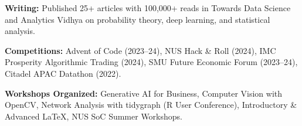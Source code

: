 \documentclass[10pt,a4paper]{article}
\begin{document}
\textbf{Writing:} Published 25+ articles with 100,000+ reads in Towards Data Science and Analytics Vidhya on probability theory, deep learning, and statistical analysis.

\vspace{3pt}

\textbf{Competitions:} Advent of Code (2023--24), NUS Hack \& Roll (2024), IMC Prosperity Algorithmic Trading (2024), SMU Future Economic Forum (2023--24), Citadel APAC Datathon (2022).

\vspace{3pt}

\textbf{Workshops Organized:} Generative AI for Business, Computer Vision with OpenCV, Network Analysis with tidygraph (R User Conference), Introductory \& Advanced \LaTeX, NUS SoC Summer Workshops.

\end{document}
